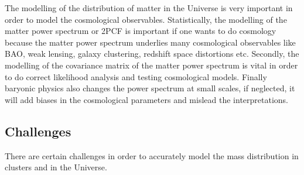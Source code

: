 The modelling of the distribution of matter in the Universe is very important
in order to model the cosmological observables. Statistically, the modelling of the
matter power spectrum or 2PCF is important if one wants to do cosmology because 
the matter power spectrum underlies many
cosmological observables like BAO, weak lensing, galaxy clustering, redshift
space distortions etc. Secondly, the modelling of the 
covariance matrix of the matter power spectrum is vital in order to do correct
likelihood analysis and testing cosmological models. Finally baryonic physics 
also changes the power spectrum at small scales, if neglected, it will add biases
in the cosmological parameters and mislead the interpretations. 

\subsection{Challenges}

There are certain challenges in order to accurately model the mass distribution
in clusters and in the Universe. 

